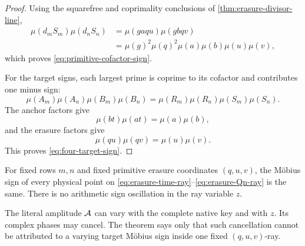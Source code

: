 \begin{proof}
Using the squarefree and coprimality conclusions of
\cref{thm:erasure-divisor-line},
\begin{align*}
 \mu(d_mS_m)\mu(d_nS_n)
 &=
 \mu(gaqu)\mu(gbqv)\\
 &=
 \mu(g)^2\mu(q)^2
 \mu(a)\mu(b)\mu(u)\mu(v),
\end{align*}
which proves \eqref{eq:primitive-cofactor-sign}.

For the target signs, each largest prime is coprime to its cofactor and
contributes one minus sign:
\[
 \mu(A_m)\mu(A_n)\mu(B_m)\mu(B_n)
 =
 \mu(R_m)\mu(R_n)\mu(S_m)\mu(S_n).
\]
The anchor factors give
\[
 \mu(bt)\mu(at)=\mu(a)\mu(b),
\]
and the erasure factors give
\[
 \mu(qu)\mu(qv)=\mu(u)\mu(v).
\]
This proves \eqref{eq:four-target-sign}.
\end{proof}

\begin{corollary}
\label{cor:frozen-ray-sign}
For fixed rows \(m,n\) and fixed primitive erasure coordinates
\((q,u,v)\), the M\"obius sign of every physical point on
\eqref{eq:erasure-time-ray}--\eqref{eq:erasure-Qn-ray} is the same.
There is no arithmetic sign oscillation in the ray variable \(z\).
\end{corollary}

\begin{remark}
\label{rem:literal-phase-can-oscillate}
The literal amplitude \(\mathcal A\) can vary with the complete native key and
with \(z\).  Its complex phases may cancel.  The theorem says only that
such cancellation cannot be attributed to a varying target M\"obius sign
inside one fixed \((q,u,v)\)-ray.
\end{remark}
